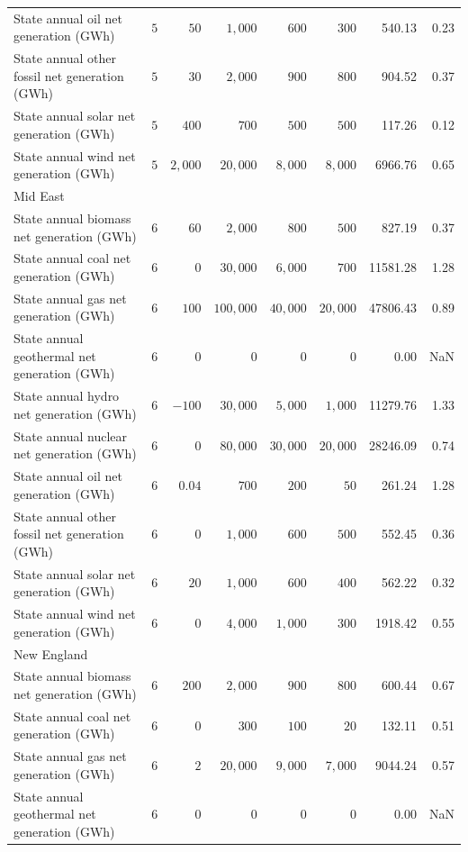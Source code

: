 \documentclass[
]{article}
\begin{document}
\begin{longtable}{lrrrrrrr}
State annual oil net generation (GWh) & $5$ & $50$ & $1,000$ & $600$ & $300$ & 540.13 & 0.23 \\ 
State annual other fossil net generation (GWh) & $5$ & $30$ & $2,000$ & $900$ & $800$ & 904.52 & 0.37 \\ 
State annual solar net generation (GWh) & $5$ & $400$ & $700$ & $500$ & $500$ & 117.26 & 0.12 \\ 
State annual wind net generation (GWh) & $5$ & $2,000$ & $20,000$ & $8,000$ & $8,000$ & 6966.76 & 0.65 \\ 
\midrule
\multicolumn{8}{l}{Mid East} \\ 
\midrule
State annual biomass net generation (GWh) & $6$ & $60$ & $2,000$ & $800$ & $500$ & 827.19 & 0.37 \\ 
State annual coal net generation (GWh) & $6$ & $0$ & $30,000$ & $6,000$ & $700$ & 11581.28 & 1.28 \\ 
State annual gas net generation (GWh) & $6$ & $100$ & $100,000$ & $40,000$ & $20,000$ & 47806.43 & 0.89 \\ 
State annual geothermal net generation (GWh) & $6$ & $0$ & $0$ & $0$ & $0$ & 0.00 & NaN \\ 
State annual hydro net generation (GWh) & $6$ & $-100$ & $30,000$ & $5,000$ & $1,000$ & 11279.76 & 1.33 \\ 
State annual nuclear net generation (GWh) & $6$ & $0$ & $80,000$ & $30,000$ & $20,000$ & 28246.09 & 0.74 \\ 
State annual oil net generation (GWh) & $6$ & $0.04$ & $700$ & $200$ & $50$ & 261.24 & 1.28 \\ 
State annual other fossil net generation (GWh) & $6$ & $0$ & $1,000$ & $600$ & $500$ & 552.45 & 0.36 \\ 
State annual solar net generation (GWh) & $6$ & $20$ & $1,000$ & $600$ & $400$ & 562.22 & 0.32 \\ 
State annual wind net generation (GWh) & $6$ & $0$ & $4,000$ & $1,000$ & $300$ & 1918.42 & 0.55 \\ 
\midrule
\multicolumn{8}{l}{New England} \\ 
\midrule
State annual biomass net generation (GWh) & $6$ & $200$ & $2,000$ & $900$ & $800$ & 600.44 & 0.67 \\ 
State annual coal net generation (GWh) & $6$ & $0$ & $300$ & $100$ & $20$ & 132.11 & 0.51 \\ 
State annual gas net generation (GWh) & $6$ & $2$ & $20,000$ & $9,000$ & $7,000$ & 9044.24 & 0.57 \\ 
State annual geothermal net generation (GWh) & $6$ & $0$ & $0$ & $0$ & $0$ & 0.00 & NaN \\ 

\end{longtable}
\end{document}
